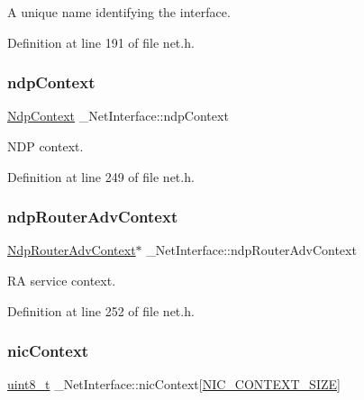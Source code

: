 A unique name identifying the interface. 



Definition at line 191 of file net.\+h.

\mbox{\label{struct__NetInterface_a7a40b9513e795c73a7e3a8e6765fe6fc}} 
\subsubsection{\texorpdfstring{ndp\+Context}{ndpContext}}
{\footnotesize\ttfamily \hyperlink{structNdpContext}{Ndp\+Context} \+\_\+\+Net\+Interface\+::ndp\+Context}



N\+DP context. 



Definition at line 249 of file net.\+h.

\mbox{\label{struct__NetInterface_ae33ba4d5428099fba444da6aad25f3a4}} 
\subsubsection{\texorpdfstring{ndp\+Router\+Adv\+Context}{ndpRouterAdvContext}}
{\footnotesize\ttfamily \hyperlink{structNdpRouterAdvContext}{Ndp\+Router\+Adv\+Context}$\ast$ \+\_\+\+Net\+Interface\+::ndp\+Router\+Adv\+Context}



RA service context. 



Definition at line 252 of file net.\+h.

\mbox{\label{struct__NetInterface_a0e5c02065f67e6b93ef268fc06e70d50}} 
\subsubsection{\texorpdfstring{nic\+Context}{nicContext}}
{\footnotesize\ttfamily \hyperlink{stdint_8h_aba7bc1797add20fe3efdf37ced1182c5}{uint8\+\_\+t} \+\_\+\+Net\+Interface\+::nic\+Context\mbox{[}\hyperlink{nic_8h_aae102aeec82fff42fcadd719a6cf41c2}{N\+I\+C\+\_\+\+C\+O\+N\+T\+E\+X\+T\+\_\+\+S\+I\+ZE}\mbox{]}}



